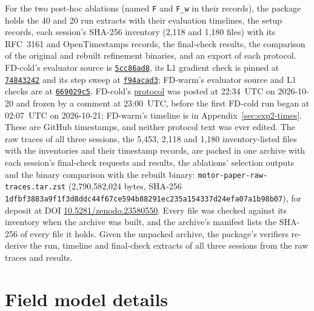 \documentclass{anvil-paper}
\begin{document}
For the two post-hoc ablations (named \texttt{F} and \texttt{F\_w} in their records), the package holds the 40 and 20 run
extracts with their evaluation timelines, the setup records, each session's SHA-256 inventory (2,118 and
1,180 files) with its RFC~3161 and OpenTimestamps records, the final-check
results, the comparison of the original and rebuilt refinement binaries,
and an export of each protocol. FD-cold's evaluator source is
\href{https://github.com/rjwalters/geode-fem/tree/5cc86ad81aeea4847a2608fcafde22a1bbfb6990/benchmarks/motor_optimization}{\texttt{5cc86ad8}},
its L1 gradient check is pinned at
\href{https://github.com/rjwalters/geode-fem/tree/74843242db03e8d57edf971420171064bf19f107/benchmarks/motor_optimization/harness}{\texttt{74843242}}
and its step sweep at
\href{https://github.com/rjwalters/geode-fem/tree/f94acad3f312c7d417830ff82b66a78a1ea89fb2/benchmarks/motor_optimization/harness}{\texttt{f94acad3}};
FD-warm's evaluator source and L1 checks are at
\href{https://github.com/rjwalters/geode-fem/tree/669029c5653cb5fe4724ec0c7525ba60c770975e/benchmarks/motor_optimization}{\texttt{669029c5}}.
FD-cold's \href{https://github.com/rjwalters/geode-fem/issues/1218}{protocol}
was posted at 22:34~UTC on 2026-10-20 and frozen by a comment at
23:00~UTC, before the first FD-cold run began at 02:07~UTC on 2026-10-21;
FD-warm's timeline is in Appendix~\ref{sec:exp2-times}. These are GitHub
timestamps, and neither protocol text was ever edited. The raw traces of all
three sessions, the 5,453, 2,118 and 1,180 inventory-listed files with the
inventories and their timestamp records, are packed in one archive with
each session's final-check requests and results, the ablations' selection
outputs and the binary comparison with the rebuilt binary:
\texttt{motor-paper-raw-traces.tar.zst} (2,790,582,024 bytes, SHA-256
\texttt{1dfbf3883a9f1f3d8ddc44f67ce594b8}\allowbreak\texttt{8291ec235a154337d24efa07a1b98b07}), for deposit at
DOI \href{https://doi.org/10.5281/zenodo.23580550}{10.5281/zenodo.23580550}. Every file was checked against its inventory
when the archive was built, and the archive's manifest lists the SHA-256
of every file it holds. Given the unpacked archive, the package's verifiers
re-derive the run, timeline and final-check extracts of all three sessions
from the raw traces and results.

\appendix
\section{Field model details}\label{sec:fieldmodel}
\end{document}
